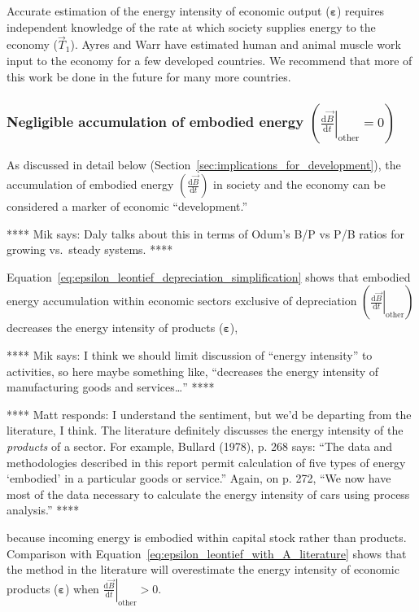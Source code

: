 Accurate estimation of the energy intensity of economic output ($\bm{\varepsilon}$)
requires independent knowledge of the rate at which society supplies
energy to the economy ($\vec{T}_{1}$). 
Ayres and Warr have estimated human and animal muscle work
input to the economy for a few developed countries.\cite{Ayres:2010ug}
We recommend that more of this work be done 
in the future for many more countries.


\subsubsection{Negligible accumulation of embodied energy
$\left( \left. \frac{\mathrm{d}\vec{B}}{\mathrm{d}t} \right|_{\mathrm{other}} = 0 \right)$}

As discussed in detail below (Section~\ref{sec:implications_for_development}),
the accumulation of embodied energy 
$\left( \frac{\mathrm{d}\vec{B}}{\mathrm{d}t} \right)$ 
in society and the economy
can be considered a marker of economic ``development.''

**** 
Mik says: Daly talks about this in terms 
of Odum's B/P vs P/B ratios for growing vs.\ steady systems.
****

Equation~\ref{eq:epsilon_leontief_depreciation_simplification} 
shows that embodied energy accumulation within economic sectors 
exclusive of depreciation
$\left( \left. \frac{\mathrm{d}\vec{B}}{\mathrm{d}t} \right|_{\mathrm{other}} \right)$ 
decreases the energy intensity of products ($\bm{\varepsilon}$),

**** Mik says: I think we should limit discussion of ``energy intensity'' 
to activities, so here maybe something like,
``decreases the energy intensity of manufacturing goods and services\ldots''
****

**** Matt responds: I understand the sentiment, 
but we'd be departing from the literature, I think. 
The literature definitely discusses the energy intensity
of the \emph{products} of a sector. 
For example, Bullard (1978), p. 268 says:
``The data and methodologies described in this report 
permit calculation of five types of energy `embodied' in a particular goods or service.''
Again, on p. 272, ``We now have most of the data necessary 
to calculate the energy intensity of cars using process analysis.''
****

because incoming energy is embodied within capital stock rather than products.
Comparison with Equation~\ref{eq:epsilon_leontief_with_A_literature}
shows that the method in the literature will overestimate the energy intensity
of economic products ($\bm{\varepsilon}$) when 
$\left. \frac{\mathrm{d}\vec{B}}{\mathrm{d}t} \right|_{\mathrm{other}} > 0$.

